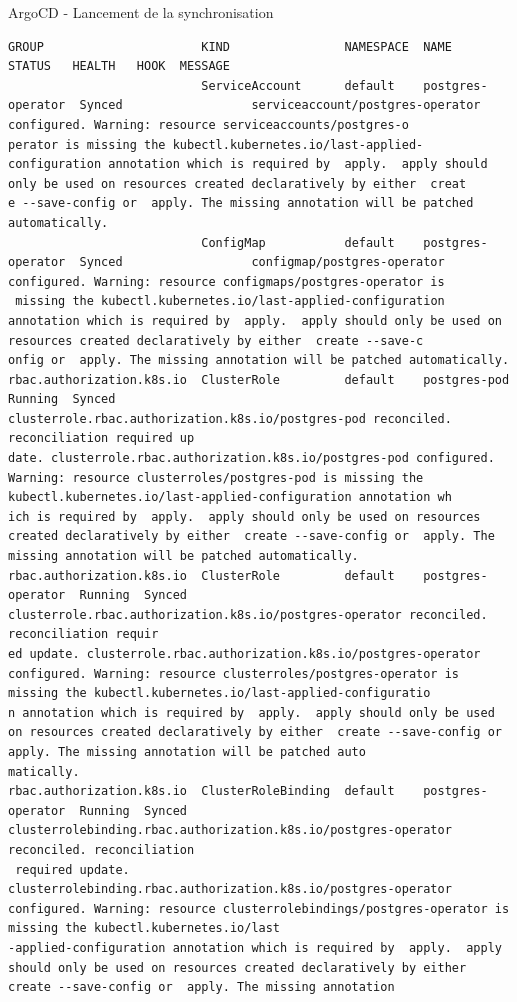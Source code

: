 \begin{frame}[fragile,shrink=1]{ArgoCD - Lancement de la synchronisation}
\begin{tiny}
\begin{Verbatim}[commandchars=\\\{\}]
GROUP                      KIND                NAMESPACE  NAME               STATUS   HEALTH   HOOK  MESSAGE
                           ServiceAccount      default    postgres-operator  Synced                  serviceaccount/postgres-operator configured. Warning: resource serviceaccounts/postgres-o
perator is missing the kubectl.kubernetes.io/last-applied-configuration annotation which is required by  apply.  apply should only be used on resources created declaratively by either  creat
e --save-config or  apply. The missing annotation will be patched automatically.
                           ConfigMap           default    postgres-operator  Synced                  configmap/postgres-operator configured. Warning: resource configmaps/postgres-operator is
 missing the kubectl.kubernetes.io/last-applied-configuration annotation which is required by  apply.  apply should only be used on resources created declaratively by either  create --save-c
onfig or  apply. The missing annotation will be patched automatically.
rbac.authorization.k8s.io  ClusterRole         default    postgres-pod       Running  Synced         clusterrole.rbac.authorization.k8s.io/postgres-pod reconciled. reconciliation required up
date. clusterrole.rbac.authorization.k8s.io/postgres-pod configured. Warning: resource clusterroles/postgres-pod is missing the kubectl.kubernetes.io/last-applied-configuration annotation wh
ich is required by  apply.  apply should only be used on resources created declaratively by either  create --save-config or  apply. The missing annotation will be patched automatically.
rbac.authorization.k8s.io  ClusterRole         default    postgres-operator  Running  Synced         clusterrole.rbac.authorization.k8s.io/postgres-operator reconciled. reconciliation requir
ed update. clusterrole.rbac.authorization.k8s.io/postgres-operator configured. Warning: resource clusterroles/postgres-operator is missing the kubectl.kubernetes.io/last-applied-configuratio
n annotation which is required by  apply.  apply should only be used on resources created declaratively by either  create --save-config or  apply. The missing annotation will be patched auto
matically.
rbac.authorization.k8s.io  ClusterRoleBinding  default    postgres-operator  Running  Synced         clusterrolebinding.rbac.authorization.k8s.io/postgres-operator reconciled. reconciliation
 required update. clusterrolebinding.rbac.authorization.k8s.io/postgres-operator configured. Warning: resource clusterrolebindings/postgres-operator is missing the kubectl.kubernetes.io/last
-applied-configuration annotation which is required by  apply.  apply should only be used on resources created declaratively by either  create --save-config or  apply. The missing annotation

\end{Verbatim}
\end{tiny}
\end{frame}
